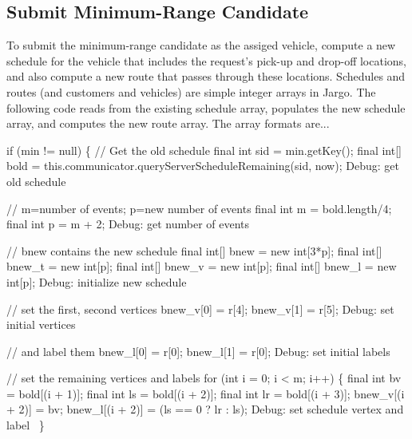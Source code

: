 \subsection{Submit Minimum-Range Candidate}

To submit the minimum-range candidate as the assiged vehicle, compute a new
schedule for the vehicle that includes the request's pick-up and drop-off
locations, and also compute a new route that passes through these locations.
Schedules and routes (and customers and vehicles) are simple integer arrays
in Jargo. The following code reads from the existing schedule array,
populates the new schedule array, and computes the new route array.
The array formats are...

\nwenddocs{}\endmoddef\nwstartdeflinemarkup{}\nwenddeflinemarkup
if (min != null) \{
  // Get the old schedule
  final int sid = min.getKey();
  final int[] bold = this.communicator.queryServerScheduleRemaining(sid, now);
  \LA{}Debug: get old schedule~{\nwtagstyle{}}\RA{}

  // m=number of events; p=new number of events
  final int m = bold.length/4;
  final int p = m + 2;
  \LA{}Debug: get number of events~{\nwtagstyle{}}\RA{}

  // bnew contains the new schedule
  final int[] bnew = new int[3*p];
  final int[] bnew_t = new int[p];
  final int[] bnew_v = new int[p];
  final int[] bnew_l = new int[p];
  \LA{}Debug: initialize new schedule~{\nwtagstyle{}}\RA{}

  // set the first, second vertices
  bnew_v[0] = r[4];
  bnew_v[1] = r[5];
  \LA{}Debug: set initial vertices~{\nwtagstyle{}}\RA{}

  // and label them
  bnew_l[0] = r[0];
  bnew_l[1] = r[0];
  \LA{}Debug: set initial labels~{\nwtagstyle{}}\RA{}

  // set the remaining vertices and labels
  for (int i = 0; i < m; i++) \{
    final int bv = bold[(i + 1)];
    final int ls = bold[(i + 2)];
    final int lr = bold[(i + 3)];
    bnew_v[(i + 2)] = bv;
    bnew_l[(i + 2)] = (ls == 0 ? lr : ls);
    \LA{}Debug: set schedule vertex and label~{\nwtagstyle{}}\RA{}
  \}

